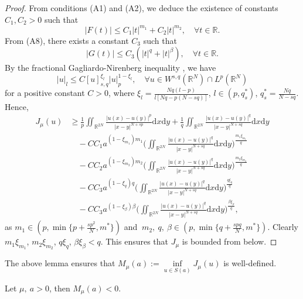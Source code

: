 \documentclass[reqno]{amsart}
\begin{document}
\begin{proof}
From  conditions (A1) and (A2), we deduce the existence of constants
$C_1, C_2>0$ such that
$$
|F(t)|\le C_1|t|^{m_1}+C_2|t|^{m_2},\quad\forall t\in\mathbb{R}.
$$
From (A8), there exists a constant $C_3$ such that
$$
|G(t)|\le C_3(|t|^{q}+|t|^{\beta}),\quad\forall t\in\mathbb{R}.
$$
By the fractional Gagliardo-Nirenberg inequality \cite{ref24}, we have
\begin{equation}\label{eqn-(2.2)}
|u|_l\le C[u]_{{s,q}}^{\xi_{l}}|u|_p^{1-\xi_{l}},\quad 
\forall u\in W^{s,q}(\mathbb {R}^N)\cap L^{p}(\mathbb {R}^N)
\end{equation}
for a positive constant $C>0$, where $\xi_{l}=\frac{Nq(l-p)}{l[Nq-p(N-sq)]}$,
$l\in(p,q_{s}^{*})$, $q_{s}^{*}=\frac{Nq}{N-sq}$. Hence,
\begin{equation}\label{eqn-(2.3)}
\begin{aligned}
J_\mu(u)
&\geq \frac{1}{p}\iint_{\mathbb{R}^{2N}}\frac{|u(x)-u(y)|^p}{|x-y|^{N+sp}}
 \mathrm{d}x\mathrm{d}y
 +\frac{1}{q}\iint_{\mathbb{R}^{2N}}\frac{|u(x)-u(y)|^q}{|x-y|^{N+sq}}\mathrm{d}x
 \mathrm{d}y\\
&\quad -CC_1a^{(1-\xi_{m_1})m_1}
 \Big(\iint_{\mathbb{R}^{2N}}\frac{|u(x)-u(y)|^q}{|x-y|^{N+sq}}\mathrm{d}x\mathrm{d}y
 \Big)^{\frac{m_1\xi_{m_1}}{q}}\\
&\quad -CC_2a^{(1-\xi_{m_2})m_{2}}
 \big(\iint_{\mathbb{R}^{2N}}\frac{|u(x)-u(y)|^q}{|x-y|^{N+sq}}\mathrm{d}x\mathrm{d}y
 \Big)^{\frac{m_2\xi_{m_2}}{q}}\\
&\quad -CC_3a^{(1-\xi_{q})q}
 \Big(\iint_{\mathbb{R}^{2N}}\frac{|u(x)-u(y)|^q}{|x-y|^{N+sq}}\mathrm{d}x\mathrm{d}y
 \Big)^{\frac{q\xi_{q}}{q}}\\
&\quad -CC_3a^{(1-\xi_{\beta})\beta}
 \Big(\iint_{\mathbb{R}^{2N}}\frac{|u(x)-u(y)|^q}{|x-y|^{N+sq}}\mathrm{d}x\mathrm{d}y
 \big)^{\frac{\beta\xi_{\beta}}{q}},
\end{aligned}
\end{equation}
as $m_1\in(p,\min\{p+\frac{sp^2}{N},m^{*}\})$ and 
$~m_2,~q,~\beta\in(p,\min\{q+\frac{spq}{N},m^{*}\})$. 
Clearly $m_1\xi_{m_1}$, $m_2\xi_{m_2}$, $q\xi_{q}$, $\beta\xi_{\beta}<q$. 
This ensures that $J_\mu$ is bounded from below.
\end{proof}

The above lemma ensures that $M_\mu(a):=\underset{u\in S(a)}\inf J_\mu(u)$ is 
well-defined.

\begin{lemma}\label{lem:2.2} 
Let $\mu,~a>0$, then $M_\mu(a)<0$.
\end{lemma}
\end{document}
